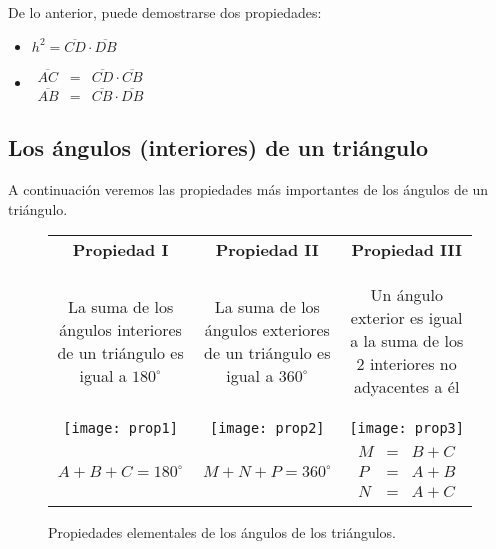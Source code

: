 De lo anterior, puede demostrarse dos propiedades:

\begin{itemize}
	\setlength\itemsep{1.5em}
	\item $h^2 = \overline{CD}\cdot \overline{DB}$
	\item 
		$\begin{array}{lcl}
		\overline{AC} & = & \overline{CD} \cdot \overline{CB} \\
		\overline{AB} & = & \overline{CB} \cdot \overline{DB}
		\end{array}$
\end{itemize}


\subsection{Los ángulos (interiores) de un triángulo}

A continuación veremos las propiedades más importantes de los 
ángulos de un triángulo.

\begin{figure*}[h!]
\def\arraystretch{1.5}%
\caption[propsTriangulos]{Propiedades elementales de los ángulos de los
	triángulos. 
}
\label{propstrig}
\begin{tabular}{c  c  c }
	\textbf{Propiedad I} & 
	\textbf{Propiedad II} & 
	\textbf{Propiedad III}                       
	\\
	\parbox{5cm}{ \begin{center}
		La suma de los ángulos interiores de un triángulo es igual a $180^\circ$	
	\end{center}}  &
	\parbox{5cm}{ \begin{center}
		La suma de los ángulos exteriores de un triángulo es igual a $360^\circ$
	\end{center}}  &
	\parbox{5cm}{ \begin{center}
		Un ángulo exterior es igual a la suma de los 2 interiores no adyacentes 
		a él
	\end{center}}  
	\\
	\texttt{[image: prop1]} & 
	\texttt{[image: prop2]}  & 
	\texttt{[image: prop3]} 
	\\ 
	$A + B + C = 180^\circ$ &
	$M + N + P = 360^\circ$&
	$\begin{array} {lcl} 
		M & = & B + C \\ 
		P & = & A + B \\ 
		N & = & A + C
	\end{array}$	
\end{tabular}
\end{figure*}

